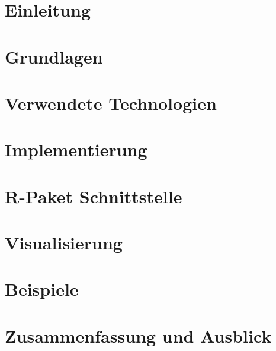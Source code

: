 \chapter{Einleitung}
\label{cha:introduction}


\chapter{Grundlagen}
\label{cha:basics}


\chapter{Verwendete Technologien}
\label{cha:technologies}


\chapter{Implementierung}
\label{cha:implementation}


\chapter{R-Paket Schnittstelle}
\label{cha:interface}


\chapter{Visualisierung}
\label{cha:visualization}


\chapter{Beispiele}
\label{cha:examples}


\chapter{Zusammenfassung und Ausblick}
\label{cha:result}
